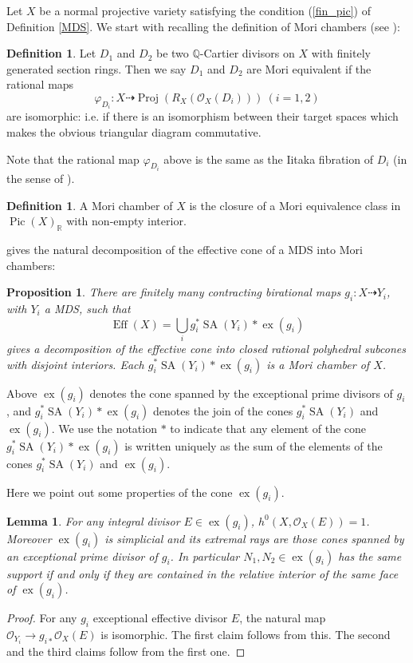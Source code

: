 \documentclass[12pt,twoside]{amsart}
\newtheorem{prop}[theo]{Proposition}
\newtheorem{lem}[theo]{Lemma}
\theoremstyle{definition}
\newtheorem{defi}[theo]{Definition}
\newcommand\SA{\mathop{\mathrm{SA}}\nolimits}
\newcommand\Pic{\mathop{\mathrm{Pic}}\nolimits}
\newcommand\Eff{\mathop{\mathrm{Eff}}\nolimits}
\newcommand\Proj{\mathop{\mathrm{Proj}}}
\newcommand\ex{\mathop{\mathrm{ex}}}
\newcommand\bq{\mathbb{Q}}
\newcommand\br{\mathbb{R}}
\newcommand\OO{\mathcal{O}}
\begin{document}
Let $X$ be a normal projective variety satisfying the condition (\ref{fin_pic}) of Definition \ref{MDS}.
We start with recalling the definition of Mori chambers (see \cite[Definition 1.3 and 1.4]{hk}):

\begin{defi}
Let $D_1$ and $D_2$ be
two $\bq$-Cartier divisors on $X$ with finitely generated
section rings.
Then we say $D_1$
and $D_2$ are Mori equivalent if the rational maps 
\begin{equation*}
\varphi_{D_i}:X\dasharrow \Proj{(R_{X}(\OO_X(D_i)))} \ (i=1,2)
\end{equation*}
are isomorphic: i.e. if there is an isomorphism between their target spaces which makes
the obvious triangular diagram commutative.
\end{defi}
Note that the rational map $\varphi_{D_i}$ above is the same as the Iitaka
fibration of $D_i$ (in the sense of \cite[Theorem 2.1.33]{l}).

\begin{defi}\label{Mori chamber}
A Mori chamber of $X$ is the closure of a Mori equivalence class in $\Pic{(X)}_{\br}$
with non-empty interior.
\end{defi}


\cite[Proposition 1.11 (2)]{hk} gives the natural decomposition of
the effective cone of a MDS into Mori chambers:

\begin{prop}\label{[Proposition 1.11 (2)]{hk}}
There are finitely many contracting birational maps $g_i:X\dasharrow Y_i$, with
$Y_i$ a MDS, such that
\begin{equation*}
\Eff{(X)}=\bigcup_{i}g_i^{*}\SA{(Y_i)}*\ex{(g_i)}
\end{equation*}
gives a decomposition of the effective cone into closed rational polyhedral subcones with
disjoint interiors. Each $g_i^{*}\SA{(Y_i)}*\ex{(g_i)}$ is a Mori chamber of $X$.
\end{prop}

Above $\ex{(g_i)}$ denotes the cone spanned by the exceptional prime divisors of $g_i$, and
$g_i^{*}\SA{(Y_i)}*\ex{(g_i)}$ denotes the join of the cones $g_i^{*}\SA{(Y_i)}$ and $\ex{(g_i)}$.
We use the notation $*$ to indicate that any element of the cone $g_i^{*}\SA{(Y_i)}*\ex{(g_i)}$
is written uniquely as the sum of the elements of the cones $g_i^{*}\SA{(Y_i)}$ and $\ex{(g_i)}$.

Here we point out some properties of the cone $\ex{(g_i)}$.
\begin{lem}\label{negative cone}
For any integral divisor $E\in\ex{(g_i)}$, $h^0(X,\OO_X(E))=1$.
Moreover $\ex{(g_i)}$ is simplicial and its extremal rays are
those cones spanned by an exceptional prime divisor of $g_i$.
In particular $N_1,N_2\in\ex{(g_i)}$ has the same support if and only if
they are contained in the relative interior of the same face of $\ex{(g_i)}$.
\end{lem}
\begin{proof}
For any $g_i$ exceptional effective divisor $E$, the natural map
$\OO_{Y_i}\to g_{i*}\OO_{X}(E)$ is isomorphic. The first claim follows
from this. The second and the third claims follow from the first one.
\end{proof}
\end{document}
